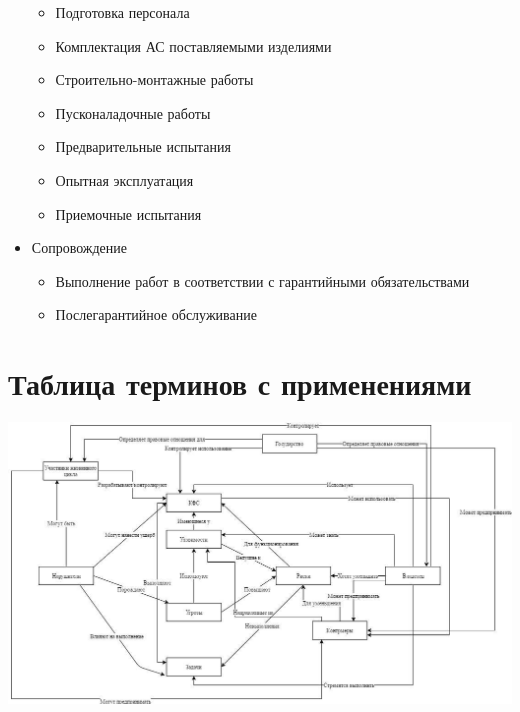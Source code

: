 \documentclass[12pt]{article}
\begin{document}
\begin{sloppypar}
\begin{itemize}
\begin{itemize}
                  \item Подготовка персонала
                  \item Комплектация АС поставляемыми изделиями
                  \item Строительно-монтажные работы
                  \item Пусконаладочные работы
                  \item Предварительные испытания
                  \item Опытная эксплуатация
                  \item Приемочные испытания
              \end{itemize}
        \item Сопровождение
              \begin{itemize}
                  \item Выполнение работ в соответствии с гарантийными обязательствами
                  \item Послегарантийное обслуживание
              \end{itemize}
    \end{itemize}

    \section{Таблица терминов с применениями}

    \includegraphics[width=\textwidth]{graphics/термины.png}


\end{sloppypar}
\end{document}

